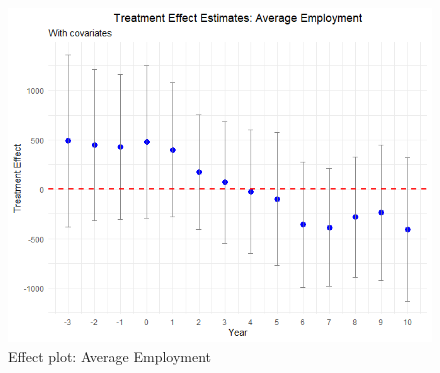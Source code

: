 \begin{figure}[htbp]
    \centering
    \includegraphics[width=\textwidth,keepaspectratio]{images/tes_emp.png}
    \caption{Effect plot: Average Employment}
    \label{fig:tes_gs_emp}
\end{figure}

